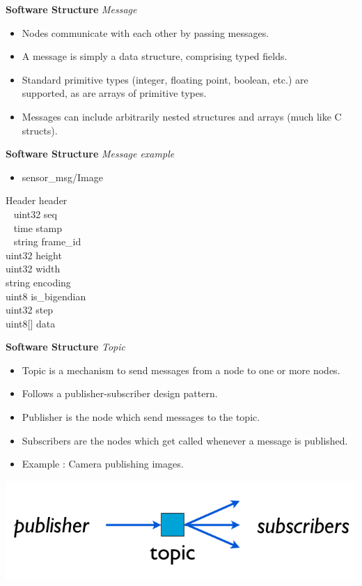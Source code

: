 \documentclass[a4paper, 10pt, conference]{ieeeconf}       %
\begin{document}
\textbf{Software Structure}
\textit{Message}

\begin{itemize}
  \item Nodes communicate with each other by passing messages.
  \item A message is simply a data structure, comprising typed fields. 
  \item Standard primitive types (integer, floating point, boolean, etc.) are supported, as are arrays of primitive types. 
  \item Messages can include arbitrarily nested structures and arrays (much like C structs).
\end{itemize}



\textbf{Software Structure}
\textit{Message example}

\begin{itemize}
  \item sensor\_msg/Image
\end{itemize}

Header header \\
~  uint32 seq \\
~  time stamp \\
~  string frame\_id \\
uint32 height \\
uint32 width \\
string encoding \\
uint8 is\_bigendian \\
uint32 step \\
uint8[] data



\textbf{Software Structure}
\textit{Topic}

\begin{itemize}
  \item Topic is a mechanism to send messages from a node to one or more nodes.
  \item Follows a publisher-subscriber design pattern.
  \item Publisher is the node which send messages to the topic.
  \item Subscribers are the nodes which get called whenever a message is published.
  \item Example : Camera publishing images.
\end{itemize}

\begin{center}
  \includegraphics[width=.6\textwidth]{topic}
\end{center}
\end{document}
